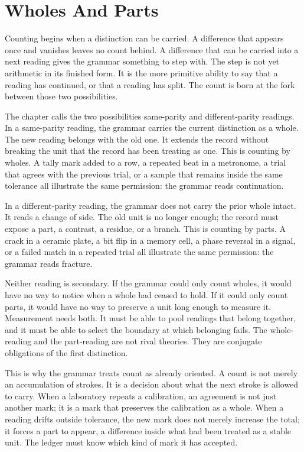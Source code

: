 \section{Wholes And Parts}

Counting begins when a distinction can be carried. A difference that
appears once and vanishes leaves no count behind. A difference that can
be carried into a next reading gives the grammar something to step with.
The step is not yet arithmetic in its finished form. It is the more
primitive ability to say that a reading has continued, or that a reading
has split. The count is born at the fork between those two possibilities.

The chapter calls the two possibilities same-parity and
different-parity readings. In a same-parity reading, the grammar carries
the current distinction as a whole. The new reading belongs with the old
one. It extends the record without breaking the unit that the record has
been treating as one. This is counting by wholes. A tally mark added to
a row, a repeated beat in a metronome, a trial that agrees with the
previous trial, or a sample that remains inside the same tolerance all
illustrate the same permission: the grammar reads continuation.

In a different-parity reading, the grammar does not carry the prior
whole intact. It reads a change of side. The old unit is no longer
enough; the record must expose a part, a contrast, a residue, or a
branch. This is counting by parts. A crack in a ceramic plate, a bit
flip in a memory cell, a phase reversal in a signal, or a failed match
in a repeated trial all illustrate the same permission: the grammar
reads fracture.

Neither reading is secondary. If the grammar could only count wholes, it
would have no way to notice when a whole had ceased to hold. If it could
only count parts, it would have no way to preserve a unit long enough to
measure it. Measurement needs both. It must be able to pool readings
that belong together, and it must be able to select the boundary at which
belonging fails. The whole-reading and the part-reading are not rival
theories. They are conjugate obligations of the first distinction.

This is why the grammar treats count as already oriented. A count is not
merely an accumulation of strokes. It is a decision about what the next
stroke is allowed to carry. When a laboratory repeats a calibration, an
agreement is not just another mark; it is a mark that preserves the
calibration as a whole. When a reading drifts outside tolerance, the new
mark does not merely increase the total; it forces a part to appear, a
difference inside what had been treated as a stable unit. The ledger must
know which kind of mark it has accepted.

